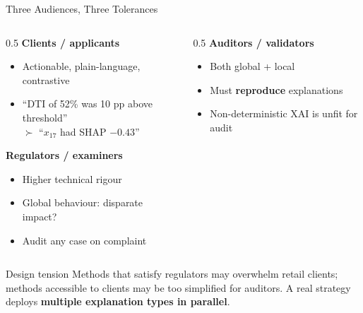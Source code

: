 \documentclass[9pt,t]{beamer}
\begin{document}
\begin{frame}{Three Audiences, Three Tolerances}
\begin{columns}[T]
\begin{column}{0.5\textwidth}
\textbf{Clients / applicants}
\begin{itemize}\small
  \item Actionable, plain-language, contrastive
  \item ``DTI of 52\% was 10 pp above threshold'' \\
        $\succ$ ``$x_{17}$ had SHAP $-0.43$''
\end{itemize}
\medskip
\textbf{Regulators / examiners}
\begin{itemize}\small
  \item Higher technical rigour
  \item Global behaviour: disparate impact?
  \item Audit any case on complaint
\end{itemize}
\end{column}
\begin{column}{0.5\textwidth}
\textbf{Auditors / validators}
\begin{itemize}\small
  \item Both global + local
  \item Must \textbf{reproduce} explanations
  \item Non-deterministic XAI is unfit for audit
\end{itemize}
\end{column}
\end{columns}

\medskip
\begin{block}{Design tension}
Methods that satisfy regulators may overwhelm retail clients; methods accessible
to clients may be too simplified for auditors. A real strategy deploys
\textbf{multiple explanation types in parallel}.
\end{block}
\end{frame}
\end{document}
